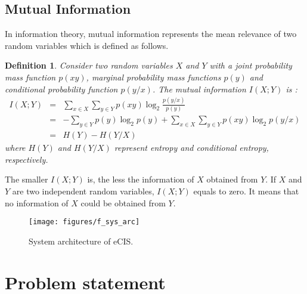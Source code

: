 \documentclass[conference]{IEEEtran}
\newtheorem{definition}{Definition}
\begin{document}
\subsection{Mutual Information}
In information theory, mutual information represents the mean relevance of two random variables which is defined as follows.
\begin{definition} \label{def_mu} \cite{elementIt2006}
Consider two random variables $X$ and $Y$ with a joint probability mass function $p(xy)$, marginal probability mass functions $p(y)$ and conditional probability function $p(y/x)$. The mutual information $I(X; Y)$ is :
\begin{eqnarray}\label{e_mut_def}
I(X; Y) & = & \underset{x\in X}{\sum}\underset{y\in Y}{\sum}p(xy)\log_{2}\frac{p(y/x)}{p(y)}\nonumber \\
 & = & -\underset{y\in Y}{\sum}p(y)\log_{2}p(y)+\underset{x\in X}{\sum}\underset{y\in Y}{\sum}p(xy)\log_{2}p(y/x)\nonumber \\
 & = & H(Y)-H(Y/X)
\end{eqnarray}
where $H(Y)$ and $H(Y/X)$ represent entropy and conditional entropy, respectively.
\end{definition}

The smaller $I(X;Y)$ is, the less the information of $X$ obtained from $Y$. If $X$ and $Y$ are two  independent random variables, $I(X;Y)$ equals to zero. It means that no information of $X$ could be obtained from $Y$.

\begin{figure}
\begin{center}
  \texttt{[image: figures/f\_sys\_arc]}\\
  \caption{System architecture of  eCIS.}\label{f_arc}
\end{center}
\end{figure}

\section{Problem statement}
\end{document}

